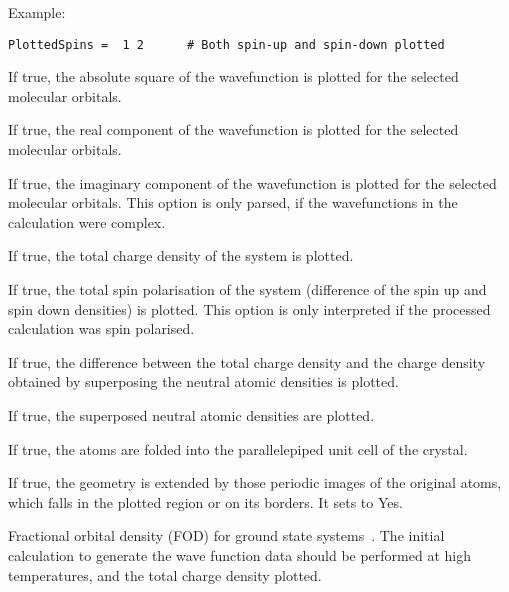 \begin{description}
Example:
\begin{verbatim}
PlottedSpins =  1 2      # Both spin-up and spin-down plotted
\end{verbatim}

\item[\is{ChargeDensity}] If true, the absolute square of the
  wavefunction is plotted for the selected molecular orbitals.

\item[\is{RealComponent}] If true, the real component of the
  wavefunction is plotted for the selected molecular orbitals.

\item[\is{ImagComponent}] If true, the imaginary component of the
  wavefunction is plotted for the selected molecular orbitals. This
  option is only parsed, if the wavefunctions in the \dftbp{}
  calculation were complex.

\item[\is{TotalChargeDensity}] If true, the total charge density of
  the system is plotted.

\item[\is{TotalSpinPolarisation} / \kw{TotalSpinPolarization}] If
  true, the total spin polarisation of the system (difference of the
  spin up and spin down densities) is plotted. This option is only
  interpreted if the processed \dftbp{} calculation was spin
  polarised.

\item[\is{TotalChargeDifference}] If true, the difference between the
  total charge density and the charge density obtained by superposing
  the neutral atomic densities is plotted.

\item[\is{TotalAtomicDensity}] If true, the superposed neutral atomic
  densities are plotted.

\item[\is{FoldAtomsToUnitCell}] If true, the atoms are folded into the
  parallelepiped unit cell of the crystal.

\item[\is{FillBoxWithAtoms}] If true, the geometry is extended by those
  periodic images of the original atoms, which falls in the plotted
  region or on its borders.  It sets  to Yes.

\item[\is{FOD}] Fractional orbital density (FOD) for ground state
  systems~\cite{grimme2015practicable}. The initial \dftbp{}
  calculation to generate the wave function data should be performed
  at high temperatures, and the total charge density plotted.


\end{description}
